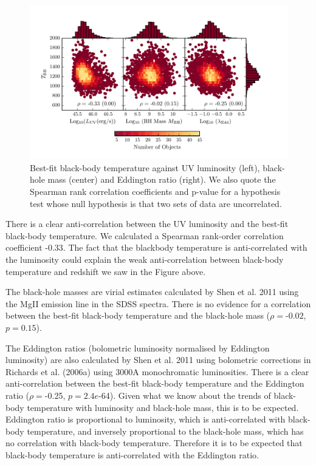 \begin{figure}
  \centering
  \includegraphics[width=\textwidth]{figures/chapter06/tbb_lowz_correlations.pdf}
  \caption{Best-fit black-body temperature against UV luminosity (left), black-hole mass (center) and Eddington ratio (right). We also quote the Spearman rank correlation coefficients and p-value for a hypothesis test whose null hypothesis is that two sets of data are uncorrelated.}
  \label{fig:}
\end{figure}

There is a clear anti-correlation between the UV luminosity and the best-fit black-body temperature. We calculated a Spearman rank-order correlation coefficient -0.33. The fact that the blackbody temperature is anti-correlated with the luminosity could explain the weak anti-correlation between black-body temperature and redshift we saw in the Figure above. 

The black-hole masses are virial estimates calculated by Shen et al. 2011 using the MgII emission line in the SDSS spectra. There is no evidence for a correlation between the best-fit black-body temperature and the black-hole mass ($\rho=$-$0.02$, $p=0.15$).  

The Eddington ratios (bolometric luminosity normalised by Eddington luminosity) are also calculated by Shen et al. 2011 using bolometric corrections in Richards et al. (2006a) using 3000A monochromatic luminosities. 
There is a clear anti-correlation between the best-fit black-body temperature and the Eddington ratio ($\rho=$-0.25, $p=2.4e$-64). 
Given what we know about the trends of black-body temperature with luminosity and black-hole mass, this is to be expected. 
Eddington ratio is proportional to luminosity, which is anti-correlated with black-body temperature, and inversely proportional to the black-hole mass, which has no correlation with black-body temperature. 
Therefore it is to be expected that black-body temperature is anti-correlated with the Eddington ratio. 

